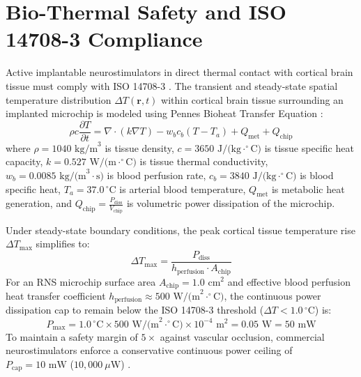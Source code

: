 \documentclass[pdflatex,sn-mathphys-num]{sn-jnl}%
\begin{document}
\section{Bio-Thermal Safety and ISO 14708-3 Compliance}\label{sec3}

Active implantable neurostimulators in direct thermal contact with cortical brain tissue must comply with ISO 14708-3 \cite{iso14708_3}. The transient and steady-state spatial temperature distribution $\Delta T(\mathbf{r}, t)$ within cortical brain tissue surrounding an implanted microchip is modeled using Pennes Bioheat Transfer Equation \cite{pennes1948analysis}:
\begin{equation}
\rho c \frac{\partial T}{\partial t} = \nabla \cdot (k \nabla T) - w_b c_b (T - T_a) + Q_{\text{met}} + Q_{\text{chip}}
\end{equation}
where $\rho = 1040\text{ kg/m}^3$ is tissue density, $c = 3650\text{ J/(kg}\cdot^\circ\text{C)}$ is tissue specific heat capacity, $k = 0.527\text{ W/(m}\cdot^\circ\text{C)}$ is tissue thermal conductivity, $w_b = 0.0085\text{ kg/(m}^3\cdot\text{s)}$ is blood perfusion rate, $c_b = 3840\text{ J/(kg}\cdot^\circ\text{C)}$ is blood specific heat, $T_a = 37.0\,^\circ\text{C}$ is arterial blood temperature, $Q_{\text{met}}$ is metabolic heat generation, and $Q_{\text{chip}} = \frac{P_{\text{diss}}}{V_{\text{chip}}}$ is volumetric power dissipation of the microchip.

Under steady-state boundary conditions, the peak cortical tissue temperature rise $\Delta T_{\text{max}}$ simplifies to:
\begin{equation}
\Delta T_{\text{max}} = \frac{P_{\text{diss}}}{h_{\text{perfusion}} \cdot A_{\text{chip}}}
\end{equation}
For an RNS microchip surface area $A_{\text{chip}} = 1.0\text{ cm}^2$ and effective blood perfusion heat transfer coefficient $h_{\text{perfusion}} \approx 500\text{ W/(m}^2\cdot^\circ\text{C)}$, the continuous power dissipation cap to remain below the ISO 14708-3 threshold ($\Delta T < 1.0\,^\circ\text{C}$) is:
\begin{equation}
P_{\text{max}} = 1.0\,^\circ\text{C} \times 500\text{ W/(m}^2\cdot^\circ\text{C)} \times 10^{-4}\text{ m}^2 = 0.05\text{ W} = 50\text{ mW}
\end{equation}
To maintain a safety margin of $5\times$ against vascular occlusion, commercial neurostimulators enforce a conservative continuous power ceiling of $P_{\text{cap}} = 10\text{ mW}$ ($10,000\ \mu\text{W}$) \cite{iso14708_3}.
\end{document}

